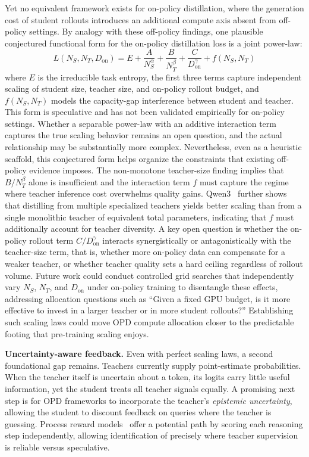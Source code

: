 \documentclass{article} %
\begin{document}
Yet no equivalent framework exists for on-policy distillation, where the generation cost of student rollouts introduces an additional compute axis absent from off-policy settings. By analogy with these off-policy findings, one plausible conjectured functional form for the on-policy distillation loss is a joint power-law:
\begin{equation}
    L(N_S, N_T, D_{\text{on}}) = E + \frac{A}{N_S^\alpha} + \frac{B}{N_T^\beta} + \frac{C}{D_{\text{on}}^\gamma} + f(N_S, N_T)
\end{equation}
where $E$ is the irreducible task entropy, the first three terms capture independent scaling of student size, teacher size, and on-policy rollout budget, and $f(N_S, N_T)$ models the capacity-gap interference between student and teacher. This form is speculative and has not been validated empirically for on-policy settings. Whether a separable power-law with an additive interaction term captures the true scaling behavior remains an open question, and the actual relationship may be substantially more complex. Nevertheless, even as a heuristic scaffold, this conjectured form helps organize the constraints that existing off-policy evidence imposes. The non-monotone teacher-size finding implies that $B/N_T^\beta$ alone is insufficient and the interaction term $f$ must capture the regime where teacher inference cost overwhelms quality gains. Qwen3~\citep{2505.09388} further shows that distilling from multiple specialized teachers yields better scaling than from a single monolithic teacher of equivalent total parameters, indicating that $f$ must additionally account for teacher diversity. A key open question is whether the on-policy rollout term $C/D_{\text{on}}^\gamma$ interacts synergistically or antagonistically with the teacher-size term, that is, whether more on-policy data can compensate for a weaker teacher, or whether teacher quality sets a hard ceiling regardless of rollout volume. Future work could conduct controlled grid searches that independently vary $N_S$, $N_T$, and $D_{\text{on}}$ under on-policy training to disentangle these effects, addressing allocation questions such as ``Given a fixed GPU budget, is it more effective to invest in a larger teacher or in more student rollouts?'' Establishing such scaling laws could move OPD compute allocation closer to the predictable footing that pre-training scaling enjoys.

\textbf{Uncertainty-aware feedback.} Even with perfect scaling laws, a second foundational gap remains. Teachers currently supply point-estimate probabilities. When the teacher itself is uncertain about a token, its logits carry little useful information, yet the student treats all teacher signals equally. A promising next step is for OPD frameworks to incorporate the teacher's \emph{epistemic uncertainty}, allowing the student to discount feedback on queries where the teacher is guessing. Process reward models~\citep{2305.20050} offer a potential path by scoring each reasoning step independently, allowing identification of precisely where teacher supervision is reliable versus speculative.
\end{document}
